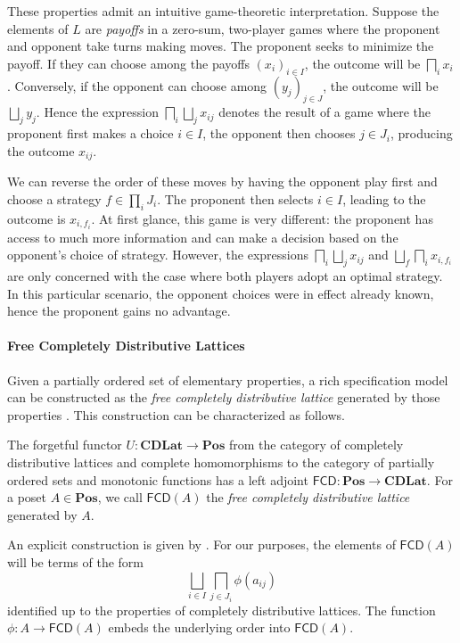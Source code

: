 \documentclass[sigplan,10pt,review,anonymous]{acmart}
\newcommand{\kw}[1]{\ensuremath{ \mathsf{#1} }}
\begin{document}
These properties admit an intuitive game-theoretic interpretation.
Suppose the elements of $L$
are \emph{payoffs} in a zero-sum, two-player games
where the proponent and opponent
take turns making moves.
The proponent seeks to minimize the payoff.
If they can choose among the payoffs $(x_i)_{i \in I}$,
the outcome will be $\bigsqcap_i x_i$.
Conversely,
if the opponent can choose among $(y_j)_{j \in J}$,
the outcome will be $\bigsqcup_j y_j$.
Hence the expression
$\bigsqcap_i \bigsqcup_j x_{ij}$
denotes the result of a game where
the proponent first makes a choice $i \in I$,
the opponent then chooses $j \in J_i$,
producing the outcome $x_{ij}$.

We can reverse the order of these moves
by having the opponent play first
and choose a strategy $f \in \prod_i J_i$.
The proponent then selects $i \in I$,
leading to the outcome is $x_{i,f_i}$.
At first glance,
this game is very different:
the proponent has access to much more information
and can make a decision based on the opponent's choice of strategy.
However,
the expressions $\bigsqcap_i \bigsqcup_j x_{ij}$
and $\bigsqcup_f \bigsqcap_i x_{i,f_i}$
are only concerned with the case where both players adopt
an optimal strategy.
In this particular scenario,
the opponent choices were in effect already known,
hence the proponent gains no advantage.

\paragraph{Free Completely Distributive Lattices}

Given a partially ordered set of elementary properties,
a rich specification model can be constructed as
the \emph{free completely distributive lattice}
generated by those properties \cite{augtyp,dndf}.
This construction can be characterized as follows.

\begin{definition}
The forgetful functor
$U : \mathbf{CDLat} \rightarrow \mathbf{Pos}$
from the category of completely distributive lattices
and complete homomorphisms
to the category of partially ordered sets
and monotonic functions
has a left adjoint
$\kw{FCD} : \mathbf{Pos} \rightarrow \mathbf{CDLat}$.
For a poset $A \in \mathbf{Pos}$,
we call $\kw{FCD}(A)$ the \emph{free completely distributive lattice}
generated by $A$.
\end{definition}

An explicit construction is given by \citet{augtyp}.
For our purposes,
the elements of $\kw{FCD}(A)$
will be terms of the form
\[
  \bigsqcup_{i \in I} \bigsqcap_{j \in J_i} \phi(a_{ij})
\]
identified up to the properties of completely distributive lattices.
The function $\phi : A \rightarrow \kw{FCD}(A)$
embeds the underlying order
into $\kw{FCD}(A)$.
\end{document}
